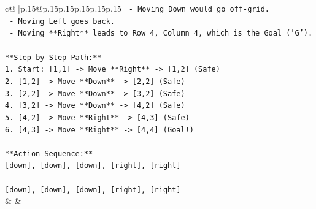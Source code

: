 \documentclass{article}
\begin{document}
{\begin{supertabular}{c@{$\;$}|p{.15\linewidth}@{}p{.15\linewidth}p{.15\linewidth}p{.15\linewidth}p{.15\linewidth}p{.15\linewidth}}
{{{\texttt{    {-} Moving Down would go off{-}grid.} \\
\texttt{    {-} Moving Left goes back.} \\
\texttt{    {-} Moving **Right** leads to Row 4, Column 4, which is the Goal ('G').} \\
\\ 
\texttt{**Step{-}by{-}Step Path:**} \\
\texttt{1.  Start: {[}1,1{]} {-}> Move **Right** {-}> {[}1,2{]} (Safe)} \\
\texttt{2.  {[}1,2{]} {-}> Move **Down** {-}> {[}2,2{]} (Safe)} \\
\texttt{3.  {[}2,2{]} {-}> Move **Down** {-}> {[}3,2{]} (Safe)} \\
\texttt{4.  {[}3,2{]} {-}> Move **Down** {-}> {[}4,2{]} (Safe)} \\
\texttt{5.  {[}4,2{]} {-}> Move **Right** {-}> {[}4,3{]} (Safe)} \\
\texttt{6.  {[}4,3{]} {-}> Move **Right** {-}> {[}4,4{]} (Goal!)} \\
\\ 
\texttt{**Action Sequence:**} \\
\texttt{{[}down{]}, {[}down{]}, {[}down{]}, {[}right{]}, {[}right{]}} \\
\\ 
\texttt{{[}down{]}, {[}down{]}, {[}down{]}, {[}right{]}, {[}right{]}} \\
            }
        }
    }
    & & \\ \\


\end{supertabular}}
\end{document}
